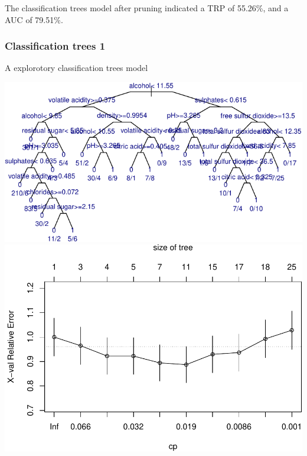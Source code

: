\documentclass[
  english,
  man]{apa6}
\begin{document}
The classification trees model after pruning indicated a TRP of 55.26\%, and a AUC of 79.51\%.

\hypertarget{classification-trees-1}{%
\subsubsection{Classification trees 1}\label{classification-trees-1}}

A explorotory classification trees model

\includegraphics{report_files/figure-latex/unnamed-chunk-6-1.pdf} \includegraphics{report_files/figure-latex/unnamed-chunk-6-2.pdf}
\end{document}
